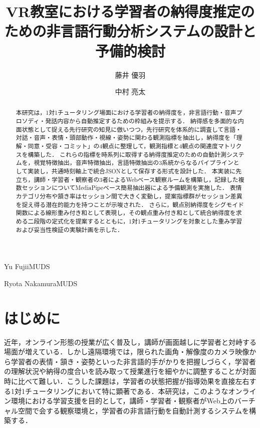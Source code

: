 \documentclass[Japanese]{dicomopapers}
\begin{document}
\title{VR教室における学習者の納得度推定のための非言語行動分析システムの設計と予備的検討}


\author{藤井 優羽}{Yu Fujii}{MUDS}
\author{中村 亮太}{Ryota Nakamura}{MUDS}

\begin{abstract}
  本研究は，1対1チュータリング場面における学習者の納得度を，非言語行動・音声プロソディ・発話内容から自動推定するための枠組みを提示する．
  納得感を多面的な内面状態として捉える先行研究の知見に倣いつつ，先行研究を体系的に調査して言語・対話・音声・表情・頭部動作・視線・姿勢に関わる観測指標を抽出し，納得度を「理解・同意・受容・コミット」の4観点に整理して，観測指標と4観点の関連度マトリクスを構築した．
  これらの指標を時系列に取得する納得度推定のための自動計測システムを，視覚特徴抽出，音声特徴抽出，言語特徴抽出の3系統からなるパイプラインとして実装し，共通時刻軸上で統合JSONとして保存する形式を設計した．
  本実装に先立ち，講師・学習者・観察者の3者によるWebベース観察ルームを構築し，記録した複数セッションについてMediaPipeベース簡易抽出器による予備観測を実施した．
  表情カテゴリ分布や頷き率はセッション間で大きく変動し，提案指標群がセッション差異を捉え得る潜在的能力を持つことが示唆された．
  さらに，観点別納得度をシグモイド関数による線形重み付き和として表現し，その観点重み付き和として統合納得度を求める二段階の定式化を提案するとともに，1対1チュータリングを対象とした重み学習および妥当性検証の実験計画を示した．
\end{abstract}

\maketitle

\section{はじめに}

近年，オンライン形態の授業が広く普及し，講師が画面越しに学習者と対峙する場面が増えている．しかし遠隔環境では，限られた画角・解像度のカメラ映像から学習者の表情・頷き・姿勢といった非言語的手がかりを把握しづらく，学習者の理解状況や納得の度合いを読み取って授業進行を細やかに調整することが対面時に比べて難しい．こうした課題は，学習者の状態把握が指導効果を直接左右する1対1チュータリングにおいて特に顕著である．本研究は，このようなオンライン環境における学習支援を目的として，講師・学習者・観察者がWeb上のバーチャル空間で会する観察環境と，学習者の非言語行動を自動計測するシステムを構築する．
\end{document}
